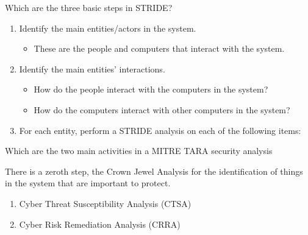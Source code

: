 \begin{questions}
\question{} Which are the three basic steps in STRIDE?\@
  \begin{solution}
    \begin{enumerate}[noitemsep]
    \item Identify the main entities/actors in the system.
      \begin{itemize}[noitemsep]
      \item These are the people and computers that interact with the system.
      \end{itemize}
    \item Identify the main entities' interactions.
      \begin{itemize}[noitemsep]
      \item How do the people interact with the computers in the system?
      \item How do the computers interact with other computers in the system?
      \end{itemize}
    \item For each entity, perform a STRIDE analysis on each of the following items:
    \end{enumerate}
  \end{solution}

\question{} Which are the two main activities in a MITRE TARA security analysis
  \begin{solution}
    There is a zeroth step, the Crown Jewel Analysis for the identification of things in the system that are important to protect.
    \begin{enumerate}[noitemsep]
    \item Cyber Threat Susceptibility Analysis (CTSA)
    \item Cyber Risk Remediation Analysis (CRRA)
    \end{enumerate}
  \end{solution}


\end{questions}
